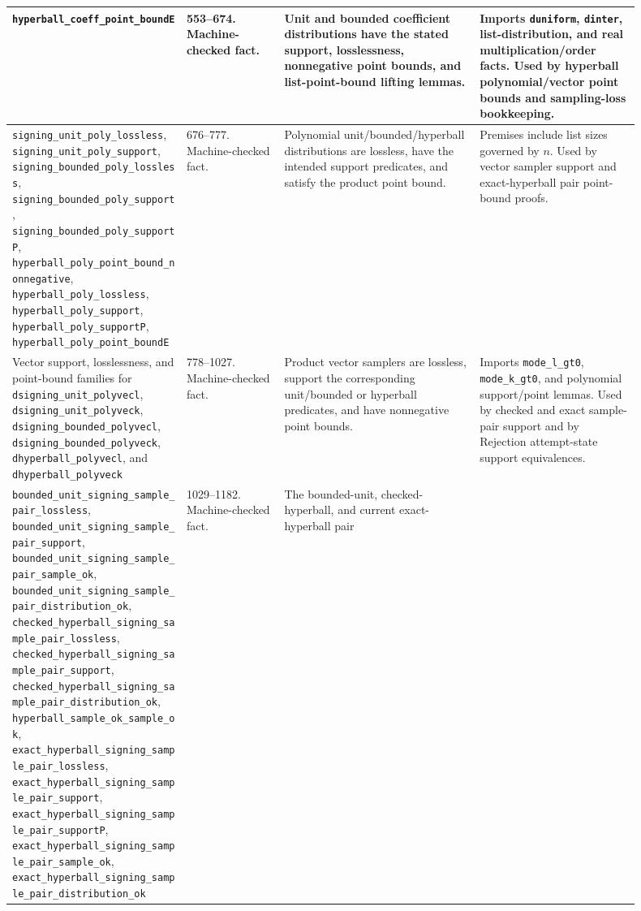 \documentclass[11pt]{report}
\DeclareRobustCommand{\ec}[1]{\ifmmode\text{\nolinkurl{#1}}\else\nolinkurl{#1}\fi}
\theoremstyle{definition}
\theoremstyle{plain}
\begin{document}
{\begin{longtable}{p{0.25\linewidth}p{0.14\linewidth}p{0.28\linewidth}p{0.23\linewidth}}
\ec{hyperball\_coeff\_point\_boundE} &
553--674. Machine-checked fact. &
Unit and bounded coefficient distributions have the stated support,
losslessness, nonnegative point bounds, and list-point-bound lifting lemmas. &
Imports \ec{duniform}, \ec{dinter}, list-distribution, and real
multiplication/order facts.  Used by hyperball polynomial/vector point bounds
and sampling-loss bookkeeping. \\
\midrule
\ec{signing\_unit\_poly\_lossless},
\ec{signing\_unit\_poly\_support},
\ec{signing\_bounded\_poly\_lossless},
\ec{signing\_bounded\_poly\_support},
\ec{signing\_bounded\_poly\_supportP},
\ec{hyperball\_poly\_point\_bound\_nonnegative},
\ec{hyperball\_poly\_lossless},
\ec{hyperball\_poly\_support},
\ec{hyperball\_poly\_supportP},
\ec{hyperball\_poly\_point\_boundE} &
676--777. Machine-checked fact. &
Polynomial unit/bounded/hyperball distributions are lossless, have the
intended support predicates, and satisfy the product point bound. &
Premises include list sizes governed by \(n\).  Used by vector sampler support
and exact-hyperball pair point-bound proofs. \\
\midrule
Vector support, losslessness, and point-bound families for
\ec{dsigning\_unit\_polyvecl}, \ec{dsigning\_unit\_polyveck},
\ec{dsigning\_bounded\_polyvecl}, \ec{dsigning\_bounded\_polyveck},
\ec{dhyperball\_polyvecl}, and \ec{dhyperball\_polyveck} &
778--1027. Machine-checked fact. &
Product vector samplers are lossless, support the corresponding unit/bounded
or hyperball predicates, and have nonnegative point bounds. &
Imports \ec{mode\_l\_gt0}, \ec{mode\_k\_gt0}, and polynomial support/point
lemmas.  Used by checked and exact sample-pair support and by Rejection
attempt-state support equivalences. \\
\midrule
\ec{bounded\_unit\_signing\_sample\_pair\_lossless},
\ec{bounded\_unit\_signing\_sample\_pair\_support},
\ec{bounded\_unit\_signing\_sample\_pair\_sample\_ok},
\ec{bounded\_unit\_signing\_sample\_pair\_distribution\_ok},
\ec{checked\_hyperball\_signing\_sample\_pair\_lossless},
\ec{checked\_hyperball\_signing\_sample\_pair\_support},
\ec{checked\_hyperball\_signing\_sample\_pair\_distribution\_ok},
\ec{hyperball\_sample\_ok\_sample\_ok},
\ec{exact\_hyperball\_signing\_sample\_pair\_lossless},
\ec{exact\_hyperball\_signing\_sample\_pair\_support},
\ec{exact\_hyperball\_signing\_sample\_pair\_supportP},
\ec{exact\_hyperball\_signing\_sample\_pair\_sample\_ok},
\ec{exact\_hyperball\_signing\_sample\_pair\_distribution\_ok} &
1029--1182. Machine-checked fact. &
The bounded-unit, checked-hyperball, and current exact-hyperball pair

\end{longtable}}
\end{document}
